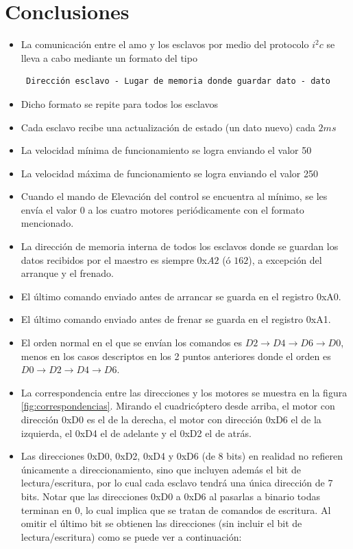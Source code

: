\documentclass[spanish,12pt,a4paper,titlepage]{report}
\begin{document}
\section{Conclusiones}
\label{sec:conclu}

\begin{itemize}
\item La comunicación entre el amo y los esclavos por medio del protocolo $i^2c$ se lleva a cabo mediante un  formato del tipo \begin{verbatim} Dirección esclavo - Lugar de memoria donde guardar dato - dato \end{verbatim}
\item Dicho formato se repite para todos los esclavos
\item Cada esclavo recibe una actualización de estado (un dato nuevo) cada $2 ms$
\item La velocidad mínima de funcionamiento se logra enviando el valor 50
\item La velocidad máxima de funcionamiento se logra enviando el valor 250
\item Cuando el mando de Elevación del control se encuentra al mínimo, se les envía el valor 0 a los cuatro motores periódicamente con el formato mencionado.
\item La dirección de memoria interna de todos los esclavos donde se guardan los datos recibidos por el maestro es siempre 0x$A2$ (ó $162$), a excepción del arranque y el frenado.
\item El último comando enviado antes de arrancar se guarda en el registro 0xA0.
\item El último comando enviado antes de frenar se guarda en el registro 0xA1.
\item El orden normal en el que se envían los comandos es $D2\rightarrow D4\rightarrow D6\rightarrow D0$, menos en los casos descriptos en los 2 puntos anteriores donde el orden es $D0\rightarrow D2\rightarrow D4\rightarrow D6$.
\item La correspondencia entre las direcciones y los motores se muestra en la figura \ref{fig:correspondencias}. Mirando el cuadricóptero desde arriba, el motor con dirección 0xD0 es el de la derecha, el motor con dirección 0xD6 el de la izquierda, el 0xD4 el de adelante y el 0xD2 el de atrás.
\item Las direcciones 0xD0, 0xD2, 0xD4 y 0xD6 (de 8 bits) en realidad no refieren únicamente a direccionamiento, sino que incluyen además el bit de lectura/escritura, por lo cual cada esclavo tendrá una única dirección de 7 bits. Notar que las direcciones 0xD0 a 0xD6 al pasarlas a binario todas terminan en 0, lo cual implica que se tratan de comandos de escritura. Al omitir el último bit se obtienen las direcciones (sin incluir el bit de lectura/escritura) como se puede ver a continuación:

\end{itemize}
\end{document}
